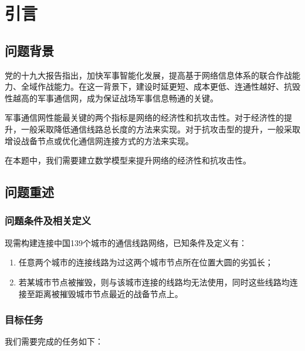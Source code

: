 \documentclass{article}
\begin{document}
\setcounter{section}{-1}


\section{引言}%
\label{sec:引言}

\subsection{问题背景}%
\label{sub:问题背景}

党的十九大报告指出，加快军事智能化发展，提高基于网络信息体系的联合作战能力、全域作战能力。在这一背景下，建设时延更短、成本更低、连通性越好、抗毁性越高的军事通信网，成为保证战场军事信息畅通的关键。

军事通信网性能最关键的两个指标是网络的经济性和抗攻击性。对于经济性的提升，一般采取降低通信线路总长度的方法来实现。对于抗攻击型的提升，一般采取增设战备节点或优化通信网连接方式的方法来实现。

在本题中，我们需要建立数学模型来提升网络的经济性和抗攻击性。


\subsection{问题重述}%
\label{sub:问题重述}

\subsubsection{问题条件及相关定义}
\label{sub:问题条件及相关定义}

现需构建连接中国139个城市的通信线路网络，已知条件及定义有：

\begin{enumerate}
	\item 任意两个城市的连接线路为过这两个城市节点所在位置大圆的劣弧长；
	\item 若某城市节点被摧毁，则与该城市连接的线路均无法使用，同时这些线路均连接至距离被摧毁城市节点最近的战备节点上。
\end{enumerate}

\subsubsection{目标任务}
\label{sub:目标任务}

我们需要完成的任务如下：
\end{document}

